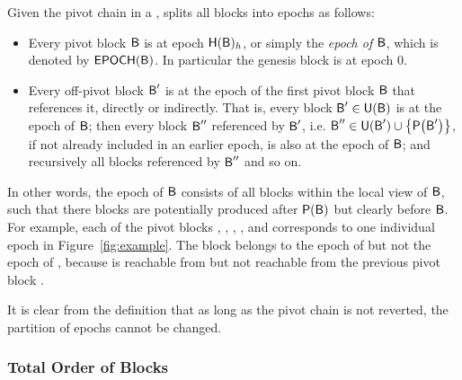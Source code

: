 Given the pivot chain in a \tg,  {\name} splits all blocks into epochs as follows:
\begin{itemize}[nosep]
	\item Every pivot block $\textsf{B}$ is at epoch $\textsf{H}(\textsf{B})_h$, or simply the \emph{epoch of} $\textsf{B}$, which is denoted by $\mathsf{EPOCH} (\textsf{B})$.
	In particular the genesis block is at epoch $0$.
	      
	\item Every off-pivot block $\textsf{B}'$ is at the epoch of the first pivot block $\textsf{B}$ that references it, directly or indirectly. 
	That is, every block $\textsf{B}'\in \textsf{U}(\textsf{B})$ is at the epoch of $\textsf{B}$; then every block $\textsf{B}''$ referenced by $\textsf{B}'$, i.e. $\textsf{B}''\in \textsf{U}(\textsf{B}')\cup {\left \{{\ensuremath{\mathsf{P}{\left({\textsf{B}'} \right)}}} \right \}}$, if not already included in an earlier epoch, is also at the epoch of $\textsf{B}$; and recursively all blocks referenced by $\textsf{B}''$ and so on.
\end{itemize}

In other words, the epoch of $\textsf{B}$ consists of all blocks within the local view of $\textsf{B}$, such that there blocks are potentially produced after $\mathsf{P}{\left({\textsf{B}} \right)}$ but clearly before $\textsf{B}$.
% 
For example, 
each of the pivot blocks , ,
, , and  corresponds to one individual epoch in Figure~\ref{fig:example}. 
The block  belongs to the epoch of  but not the epoch of , because  is
reachable from  but not reachable from the previous pivot block .

It is clear from the definition that as long as the pivot chain is not reverted, the partition of epochs cannot be changed.



\subsubsection{Total Order of Blocks}
\label{sec:total order}

